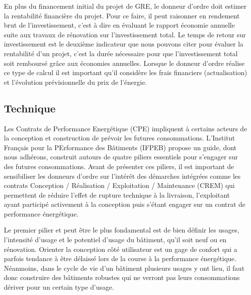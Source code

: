En plus du financement initial du projet de GRE, le donneur d'ordre doit estimer la rentabilité financière du projet. Pour ce faire, il peut raisonner en rendement brut de l'investissement, c'est à dire en évaluant le rapport économie annuelle suite aux travaux de rénovation sur l'investissement total. Le temps de retour sur investissement est le deuxième indicateur que nous pouvons citer pour évaluer la rentabilité d'un projet, c'est la durée nécessaire pour que l'investissement total soit remboursé grâce aux économies annuelles. Lorsque le donneur d'ordre réalise ce type de calcul il est important qu'il considère les frais financiers (actualisation) et l'évolution prévisionnelle du prix de l'énergie.

\subsection{Technique}
\label{Engagement performantiel - Technique}

Les Contrats de Performance Energétique (CPE) impliquent à certains acteurs de la conception et construction de prévoir les futures consommations. L'Institut Français pour la PErformance des Bâtiments (IFPEB) \cite{IFPEB-2014} propose un guide, dont nous adhérons, construit autours de quatre piliers essentiels pour s'engager sur des futures consommations. Avant de présenter ces piliers, il est important de sensibiliser les donneurs d'ordre sur l'intérêt des démarches intégrées comme les contrats Conception / Réalisation / Exploitation / Maintenance (CREM) qui permettent de réduire l'effet de rupture technique à la livraison, l'exploitant ayant participé activement à la conception puis s'étant engager sur un contrat de performance énergétique.

Le premier pilier et peut être le plus fondamental est de bien définir les usages, l'intensité d'usage et le potentiel d'usage du bâtiment, qu'il soit neuf ou en rénovation. Orienter la conception côté utilisateur est un gage de confort qui a parfois tendance à être délaissé lors de la course à la performance énergétique. Néanmoins, dans le cycle de vie d'un bâtiment plusieurs usages y ont lieu, il faut donc construire des bâtiments robustes qui ne verront pas leurs consommations dériver pour un certain type d'usage.

